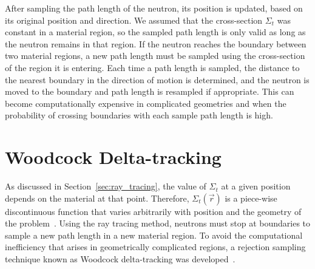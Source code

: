 After sampling the path length of the neutron, its position is
updated, based on its original position and direction. We assumed that
the cross-section $\Sigma_t$ was constant in a material region, so the
sampled path length is only valid as long as the neutron remains in
that region.  If the neutron reaches the boundary between two material
regions, a new path length must be sampled using the cross-section of
the region it is entering. Each time a path length is sampled, the
distance to the nearest boundary in the direction of motion is
determined, and the neutron is moved to the boundary and path length
is resampled if appropriate. This can become computationally expensive
in complicated geometries and when the probability of crossing
boundaries with each sample path length is high.

\section{Woodcock Delta-tracking}
\label{sec:delta-tracking}

As discussed in Section~\ref{sec:ray_tracing}, the value of $\Sigma_t$
at a given position depends on the material at that point. Therefore,
$\Sigma_t(\vec{r})$ is a piece-wise discontinuous function that varies
arbitrarily with position and the geometry of the
problem~\cite{leppanen2013}. Using the ray tracing method, neutrons
must stop at boundaries to sample a new path length in a new material
region. To avoid the computational inefficiency that arises in
geometrically complicated regions, a rejection sampling technique
known as Woodcock delta-tracking was developed~\cite{woodcock1965}.


